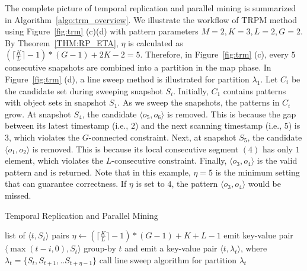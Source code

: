 The complete picture of temporal replication and parallel mining is summarized in Algorithm~\ref{algo:trm_overview}. We illustrate the workflow of TRPM method using Figure~\ref{fig:trm} (c)(d) with pattern
parameters $M=2, K=3, L = 2, G=2$. By Theorem~\ref{THM:RP_ETA}, $\eta$ is calculated
as $(\lceil \frac{K}{L} \rceil-1) *(G-1)+2K - 2 = 5$. Therefore, 
in Figure~\ref{fig:trm} (c), every $5$ consecutive snapshots are combined 
into a partition in the map phase. In Figure~\ref{fig:trm} (d), a line sweep
method is illustrated for partition $\lambda_1$. Let $C_i$ be the candidate set
during sweeping snapshot $S_i$.
Initially, $C_1$ contains patterns with object sets in snapshot $S_1$.
As we sweep the snapshots, the patterns in $C_i$ grow. At snapshot $S_4$, the candidate
$\langle o_5,o_6 \rangle$ is removed. This is because the gap between its latest timestamp (i.e., $2$)
and the next scanning timestamp (i.e., $5$) is $3$, which violates the $G$-connected constraint.
Next, at snapshot $S_5$, the candidate $\langle o_1,o_2 \rangle$ is removed. This is
because its local consecutive segment $(4)$ has only $1$ element,
which violates the $L$-consecutive constraint.
Finally, $\langle o_3,o_4 \rangle$ is the valid pattern and is returned. Note that in this example, $\eta=5$ is the minimum setting that can guarantee correctness. If $\eta$ is set to $4$, the pattern $\langle o_3,o_4 \rangle$ would be missed. 

\begin{algorithm}[h]
\caption{Temporal Replication and Parallel Mining}
\label{algo:trm_overview}
\begin{algorithmic}[1]
\Require list of $\langle t, S_t \rangle$ pairs
\State $\eta \gets (\lceil \frac{K}{L} \rceil -1)*(G-1)+K+L-1$
\label{code:trm-map-start}
		\State emit key-value pair $\langle \max(t-i,0), S_t \rangle$ 
	\EndFor  
\EndFor
\label{code:trm-map-end}
\label{code:trm-par-start}
\State group-by $t$ and emit a key-value pair $\langle t, \lambda_t\rangle$, where $\lambda_t = \{S_t, S_{t+1}, .. S_{t+\eta-1}\} $
\EndFor
\label{code:trm-par-end}
\label{code:trm-red-start}
\State call line sweep algorithm for partition $\lambda_t$
\label{code:trm-red-end}
\EndFor
\end{algorithmic}
\end{algorithm}
